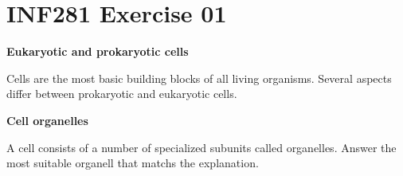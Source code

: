 \documentclass[12pt, answers]{exam}
\begin{document}
\section*{INF281 Exercise 01}

\begin{questions}

\question \textbf{Eukaryotic and prokaryotic cells}
 
 Cells are the most basic building blocks of all living organisms. Several aspects differ between prokaryotic and eukaryotic cells.
  
\vspace{0.1 in}
      

\question \textbf{Cell organelles}
  
A cell consists of a number of specialized subunits called organelles. Answer the most suitable organell that matchs the explanation. 

\vspace{0.1 in}

\end{questions}
\end{document}
